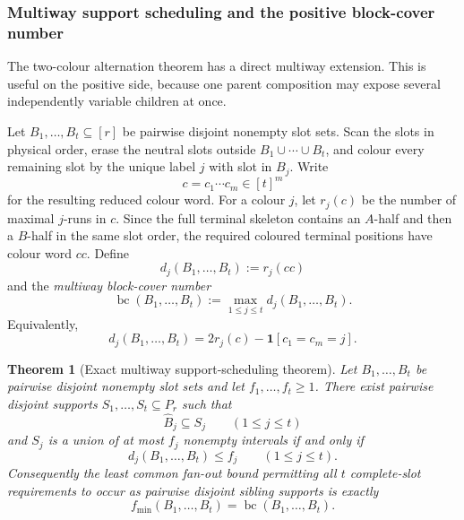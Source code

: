 \documentclass[11pt]{article}
\newtheorem{theorem}[definition]{Theorem}
\begin{document}
\subsubsection{Multiway support scheduling and the positive block-cover number}
\label{subsubsec:multiway-support-scheduling}

The two-colour alternation theorem has a direct multiway extension.  This is
useful on the positive side, because one parent composition may expose several
independently variable children at once.

Let $B_1,\ldots,B_t\subseteq[r]$ be pairwise disjoint nonempty slot sets.  Scan
the slots in physical order, erase the neutral slots outside
$B_1\cup\cdots\cup B_t$, and colour every remaining slot by the unique label
$j$ with slot in $B_j$.  Write
\[
 c=c_1\cdots c_m\in[t]^m
\]
for the resulting reduced colour word.  For a colour $j$, let
$r_j(c)$ be the number of maximal $j$-runs in $c$.  Since the full terminal
skeleton contains an $A$-half and then a $B$-half in the same slot order, the
required coloured terminal positions have colour word $cc$.  Define
\[
 d_j(B_1,\ldots,B_t):=r_j(cc)
\]
and the \emph{multiway block-cover number}
\[
 \boxed{
 \operatorname{bc}(B_1,\ldots,B_t)
 :=\max_{1\le j\le t} d_j(B_1,\ldots,B_t).
 }
\]
Equivalently,
\[
 d_j(B_1,\ldots,B_t)
 =2r_j(c)-\mathbf{1}[c_1=c_m=j].                  \tag{$\dagger$}
\]

\begin{theorem}[Exact multiway support-scheduling theorem]
\label{thm:multiway-support-scheduling}
Let $B_1,\ldots,B_t$ be pairwise disjoint nonempty slot sets and let
$f_1,\ldots,f_t\ge1$.  There exist pairwise disjoint supports
$S_1,\ldots,S_t\subseteq P_r$ such that
\[
 \widehat B_j\subseteq S_j
 \qquad(1\le j\le t)
\]
and $S_j$ is a union of at most $f_j$ nonempty intervals if and only if
\[
 \boxed{
 d_j(B_1,\ldots,B_t)\le f_j
 \qquad(1\le j\le t).
 }
\]
Consequently the least common fan-out bound permitting all $t$ complete-slot
requirements to occur as pairwise disjoint sibling supports is exactly
\[
 \boxed{
 f_{\min}(B_1,\ldots,B_t)
 =\operatorname{bc}(B_1,\ldots,B_t).
 }
\]
\end{theorem}
\end{document}
